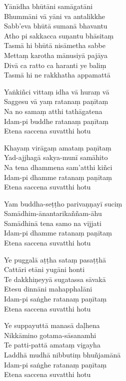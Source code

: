 \bigskip

\begin{paritta}

Yānīdha bhūtāni samāgatāni\\
Bhummāni vā yāni va antalikkhe\\
Sabb'eva bhūtā sumanā bhavantu\\
Atho pi sakkacca suṇantu bhāsitaṃ\\
Tasmā hi bhūtā nisāmetha sabbe\\
Mettaṃ karotha mānusiyā pajāya\\
Divā ca ratto ca haranti ye baliṃ\\
Tasmā hi ne rakkhatha appamattā


\label{yankinci-vittam}
%
Yaṅkiñci vittaṃ idha vā huraṃ vā\\
Saggesu vā yaṃ ratanaṃ paṇītaṃ\\
Na no samaṃ atthi tathāgatena\\
Idam-pi buddhe ratanaṃ paṇītaṃ\\
Etena saccena suvatthi hotu

\clearpage

%
Khayaṃ virāgaṃ amataṃ paṇītaṃ\\
Yad-ajjhagā sakya-munī samāhito\\
Na tena dhammena sam'atthi kiñci\\
Idam-pi dhamme ratanaṃ paṇītaṃ\\
Etena saccena suvatthi hotu

%
Yam buddha-seṭṭho parivaṇṇayī suciṃ\\
Samādhim-ānantarikaññam-āhu\\
Samādhinā tena samo na vijjati\\
Idam-pi dhamme ratanaṃ paṇītaṃ\\
Etena saccena suvatthi hotu

%
Ye puggalā aṭṭha sataṃ pasaṭṭhā\\
Cattāri etāni yugāni honti\\
Te dakkhiṇeyyā sugatassa sāvakā\\
Etesu dinnāni mahapphalāni\\
Idam-pi saṅghe ratanaṃ paṇītaṃ\\
Etena saccena suvatthi hotu

%
Ye suppayuttā manasā daḷhena\\
Nikkāmino gotama-sāsanamhi\\
Te patti-pattā amataṃ vigayha\\
Laddhā mudhā nibbutiṃ bhuñjamānā\\
Idam-pi saṅghe ratanaṃ paṇītaṃ\\
Etena saccena suvatthi hotu


\end{paritta}
